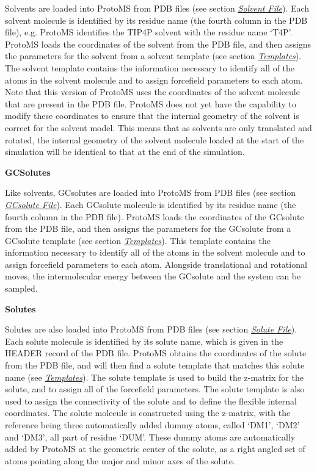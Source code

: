 \documentclass[letterpaper,10pt,english]{sphinxmanual}
\begin{document}
Solvents are loaded into ProtoMS from PDB files (see section {\hyperref[protoms:solventpdb]{\emph{Solvent File}}}). Each solvent molecule is identified by its residue name (the fourth column in the PDB file), e.g. ProtoMS identifies the TIP4P solvent with the residue name ‘T4P’. ProtoMS loads the coordinates of the solvent from the PDB file, and then assigns the parameters for the solvent from a solvent template (see section {\hyperref[protoms:temref]{\emph{Templates}}}). The solvent template contains the information necessary to identify all of the atoms in the solvent molecule and to assign forcefield parameters to each atom. Note that this version of ProtoMS uses the coordinates of the solvent molecule that are present in the PDB file. ProtoMS does not yet have the capability to modify these coordinates to ensure that the internal geometry of the solvent is correct for the solvent model. This means that as solvents are only translated and rotated, the internal geometry of
the solvent molecule loaded at the start of the simulation will be identical to that at the end of the simulation.

\textbf{GCSolutes}

Like solvents, GCsolutes are loaded into ProtoMS from PDB files (see section {\hyperref[protoms:gcpdb]{\emph{GCsolute File}}}). Each GCsolute molecule is identified by its residue name (the fourth column in the PDB file). ProtoMS loads the coordinates of the GCsolute from the PDB file, and then assigns the parameters for the GCsolute from a GCsolute template (see section {\hyperref[protoms:temref]{\emph{Templates}}}). This template contains the information necessary to identify all of the atoms in the solvent molecule and to assign forcefield parameters to each atom. Alongside translational and rotational moves, the intermolecular energy between the GCsolute and the system can be sampled.

\textbf{Solutes}

Solutes are also loaded into ProtoMS from PDB files (see section {\hyperref[protoms:solpdb]{\emph{Solute File}}}). Each solute molecule is identified by its solute name, which is given in the HEADER record of the PDB file. ProtoMS obtains the coordinates of the solute from the PDB file, and will then find a solute template that matches this solute name (see {\hyperref[protoms:temref]{\emph{Templates}}}). The solute template is used to build the z-matrix for the solute, and to assign all of the forcefield parameters. The solute template is also used to assign the connectivity of the solute and to define the flexible internal coordinates. The solute molecule is constructed using the z-matrix, with the reference being three automatically added dummy atoms, called ‘DM1’, ‘DM2’ and ‘DM3’, all part of residue ‘DUM’. These dummy atoms are automatically added by ProtoMS at the geometric center of the solute, as a right angled set of atoms pointing along the major and minor axes of the solute.
\end{document}
